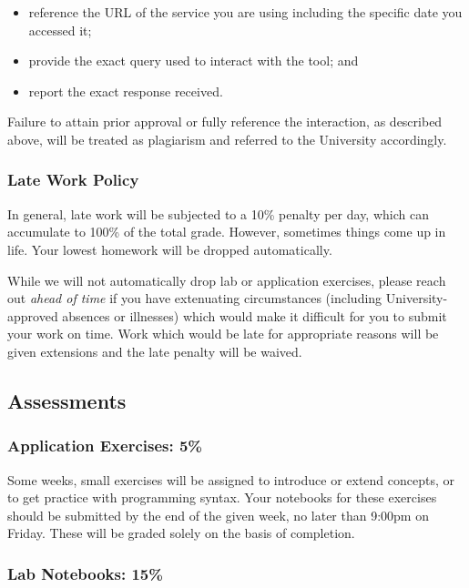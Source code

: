 \documentclass[
  letterpaper,
  DIV=11,
  numbers=noendperiod]{scrartcl}
\providecommand{\tightlist}{%
  \setlength{\itemsep}{0pt}\setlength{\parskip}{0pt}}\usepackage{longtable,booktabs,array}
\begin{document}
\begin{itemize}
\tightlist
\item
  reference the URL of the service you are using including the specific
  date you accessed it;
\item
  provide the exact query used to interact with the tool; and
\item
  report the exact response received.
\end{itemize}

Failure to attain prior approval or fully reference the interaction, as
described above, will be treated as plagiarism and referred to the
University accordingly.

\hypertarget{late-work-policy}{%
\subsubsection{Late Work Policy}\label{late-work-policy}}

In general, late work will be subjected to a 10\% penalty per day, which
can accumulate to 100\% of the total grade. However, sometimes things
come up in life. Your lowest homework will be dropped automatically.

While we will not automatically drop lab or application exercises,
please reach out \emph{ahead of time} if you have extenuating
circumstances (including University-approved absences or illnesses)
which would make it difficult for you to submit your work on time. Work
which would be late for appropriate reasons will be given extensions and
the late penalty will be waived.

\hypertarget{assessments}{%
\subsection{Assessments}\label{assessments}}

\hypertarget{application-exercises-5}{%
\subsubsection{Application Exercises:
5\%}\label{application-exercises-5}}

Some weeks, small exercises will be assigned to introduce or extend
concepts, or to get practice with programming syntax. Your notebooks for
these exercises should be submitted by the end of the given week, no
later than 9:00pm on Friday. These will be graded solely on the basis of
completion.

\hypertarget{lab-notebooks-15}{%
\subsubsection{Lab Notebooks: 15\%}\label{lab-notebooks-15}}
\end{document}
